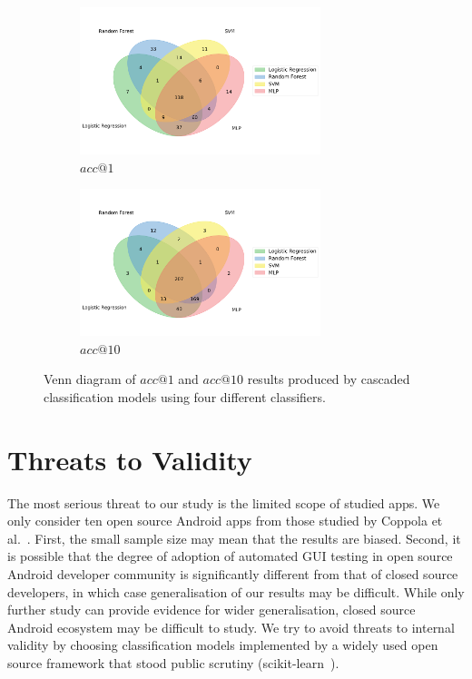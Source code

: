 \documentclass[sigconf]{acmart}
\begin{document}
\begin{figure}
  \centering
  \begin{subfigure}{0.45\textwidth}
    \includegraphics[width=70mm]{images/4_models_acc1.pdf}
    \caption{$acc@1$\label{fig:model_4_1}}
  \end{subfigure}
  \begin{subfigure}{0.45\textwidth}
    \includegraphics[width=70mm]{images/4_models_acc10.pdf}
    \caption{$acc@10$\label{fig:model_4_10}}
  \end{subfigure}
  \caption{Venn diagram of $acc@1$ and $acc@10$ results produced by cascaded classification models using four different classifiers.\label{fig:model_4}}
\end{figure}

\section{Threats to Validity}
\label{sec:threats}

The most serious threat to our study is the limited scope of studied apps. We 
only consider ten open source Android apps from those studied by Coppola et 
al.~\cite{Coppola2016rd}. First, the small sample size may mean that the 
results are biased. Second, it is possible that the degree of adoption of 
automated GUI testing in open source Android developer community is 
significantly different from that of closed source developers, in which case 
generalisation of our results may be difficult. While only further study can 
provide evidence for wider generalisation, closed source Android ecosystem may 
be difficult to study. We try to avoid threats to internal validity by 
choosing classification models implemented by a widely used open source 
framework that stood public scrutiny (scikit-learn~\cite{Pedregosa2011fu}).
\end{document}
